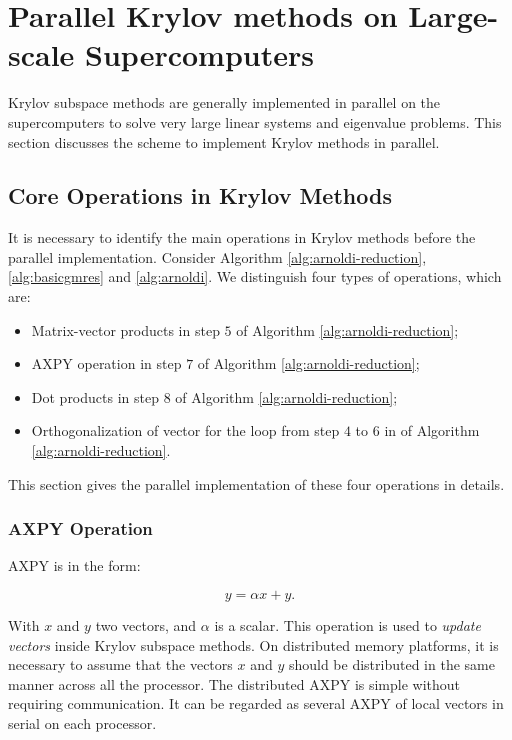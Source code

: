 \section{Parallel Krylov methods on Large-scale Supercomputers}

Krylov subspace methods are generally implemented in parallel on the supercomputers to solve very large linear systems and eigenvalue problems. This section discusses the scheme to implement Krylov methods in parallel.

\subsection{Core Operations in Krylov Methods}

It is necessary to identify the main operations in Krylov methods before the parallel implementation. Consider Algorithm \ref{alg:arnoldi-reduction}, \ref{alg:basicgmres} and \ref{alg:arnoldi}. We distinguish four types of operations, which are:

\begin{itemize}
	\item Matrix-vector products in step $5$ of Algorithm \ref{alg:arnoldi-reduction};
	\item AXPY operation in step $7$ of Algorithm \ref{alg:arnoldi-reduction};
	\item Dot products in step $8$ of Algorithm \ref{alg:arnoldi-reduction};
	\item Orthogonalization of vector for the loop from step $4$ to $6$ in of Algorithm \ref{alg:arnoldi-reduction}.
\end{itemize}

This section gives the parallel implementation of these four operations in details.

\subsubsection{AXPY Operation}

AXPY is in the form:

\begin{equation}
y = \alpha x + y.
\end{equation}

With $x$ and $y$ two vectors, and $\alpha$ is a scalar. This operation is used to \textit{update vectors} inside Krylov subspace methods. On distributed memory platforms, it is necessary to assume that the vectors $x$ and $y$ should be distributed in the same manner across all the processor. The distributed AXPY is simple without requiring communication. It can be regarded as several AXPY of local vectors in serial on each processor.


